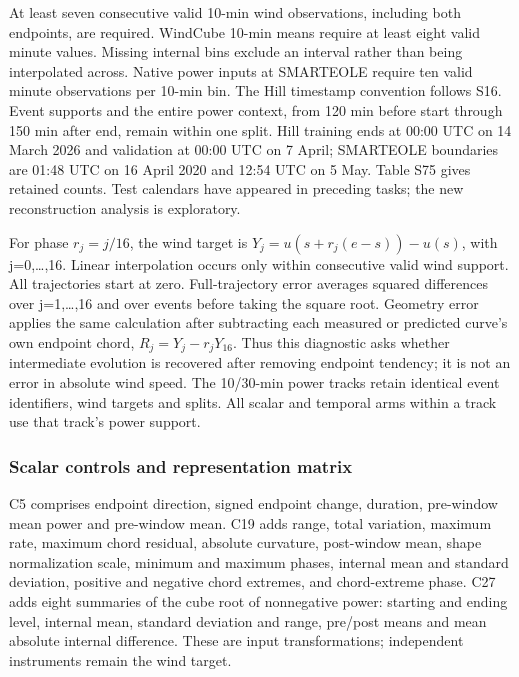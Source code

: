 \documentclass[a4paper,11pt]{article}
\begin{document}
At least seven consecutive valid 10-min wind observations, including both endpoints, are required. WindCube 10-min means require at least eight valid minute values. Missing internal bins exclude an interval rather than being interpolated across. Native power inputs at SMARTEOLE require ten valid minute observations per 10-min bin. The Hill timestamp convention follows S16. Event supports and the entire power context, from 120 min before start through 150 min after end, remain within one split. Hill training ends at 00:00 UTC on 14 March 2026 and validation at 00:00 UTC on 7 April; SMARTEOLE boundaries are 01:48 UTC on 16 April 2020 and 12:54 UTC on 5 May. Table S75 gives retained counts. Test calendars have appeared in preceding tasks; the new reconstruction analysis is exploratory.

For phase \(r_j=j/16\), the wind target is \(Y_j=u(s+r_j(e-s))-u(s)\), with j=0,\ldots,16. Linear interpolation occurs only within consecutive valid wind support. All trajectories start at zero. Full-trajectory error averages squared differences over j=1,\ldots,16 and over events before taking the square root. Geometry error applies the same calculation after subtracting each measured or predicted curve's own endpoint chord, \(R_j=Y_j-r_jY_{16}\). Thus this diagnostic asks whether intermediate evolution is recovered after removing endpoint tendency; it is not an error in absolute wind speed. The 10/30-min power tracks retain identical event identifiers, wind targets and splits. All scalar and temporal arms within a track use that track's power support.

\subsubsection{Scalar controls and representation matrix}\label{scalar-controls-and-representation-matrix}

C5 comprises endpoint direction, signed endpoint change, duration, pre-window mean power and pre-window mean. C19 adds range, total variation, maximum rate, maximum chord residual, absolute curvature, post-window mean, shape normalization scale, minimum and maximum phases, internal mean and standard deviation, positive and negative chord extremes, and chord-extreme phase. C27 adds eight summaries of the cube root of nonnegative power: starting and ending level, internal mean, standard deviation and range, pre/post means and mean absolute internal difference. These are input transformations; independent instruments remain the wind target.
\end{document}
